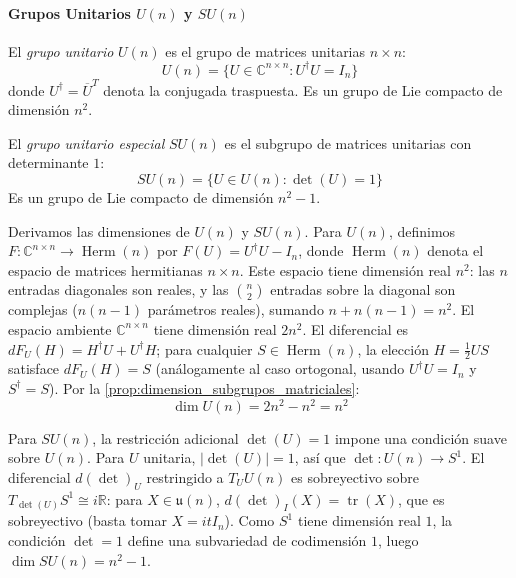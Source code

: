 \paragraph{Grupos Unitarios $U(n)$ y $SU(n)$}

\begin{definition}\label{def:grupo_u_n}
El \textit{grupo unitario} $U(n)$ es el grupo de matrices unitarias $n \times n$:
\begin{equation}
U(n) = \{U \in \mathbb{C}^{n \times n} : U^\dagger U = I_n\}
\end{equation}
donde $U^\dagger = \overline{U}^T$ denota la conjugada traspuesta. Es un grupo de Lie compacto de dimensión $n^2$.
\end{definition}

\begin{definition}\label{def:grupo_su_n}
El \textit{grupo unitario especial} $SU(n)$ es el subgrupo de matrices unitarias con determinante $1$:
\begin{equation}
SU(n) = \{U \in U(n) : \det(U) = 1\}
\end{equation}
Es un grupo de Lie compacto de dimensión $n^2 - 1$.
\end{definition}

Derivamos las dimensiones de $U(n)$ y $SU(n)$. Para $U(n)$, definimos $F: \mathbb{C}^{n \times n} \to \operatorname{Herm}(n)$ por $F(U) = U^\dagger U - I_n$, donde $\operatorname{Herm}(n)$ denota el espacio de matrices hermitianas $n \times n$. Este espacio tiene dimensión real $n^2$: las $n$ entradas diagonales son reales, y las $\binom{n}{2}$ entradas sobre la diagonal son complejas ($n(n-1)$ parámetros reales), sumando $n + n(n-1) = n^2$. El espacio ambiente $\mathbb{C}^{n \times n}$ tiene dimensión real $2n^2$. El diferencial es $dF_U(H) = H^\dagger U + U^\dagger H$; para cualquier $S \in \operatorname{Herm}(n)$, la elección $H = \frac{1}{2}US$ satisface $dF_U(H) = S$ (análogamente al caso ortogonal, usando $U^\dagger U = I_n$ y $S^\dagger = S$). Por la \autoref{prop:dimension_subgrupos_matriciales}:
\[
	\dim U(n) = 2n^2 - n^2 = n^2
\]

Para $SU(n)$, la restricción adicional $\det(U) = 1$ impone una condición suave sobre $U(n)$. Para $U$ unitaria, $|\det(U)| = 1$, así que $\det: U(n) \to S^1$. El diferencial $d(\det)_U$ restringido a $T_U U(n)$ es sobreyectivo sobre $T_{\det(U)}S^1 \cong i\mathbb{R}$: para $X \in \mathfrak{u}(n)$, $d(\det)_I(X) = \operatorname{tr}(X)$, que es sobreyectivo (basta tomar $X = itI_n$). Como $S^1$ tiene dimensión real $1$, la condición $\det = 1$ define una subvariedad de codimensión $1$, luego $\dim SU(n) = n^2 - 1$.

